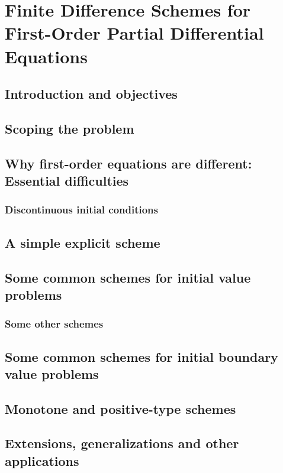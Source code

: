 \chapter{Finite Difference Schemes for First-Order Partial Differential Equations}

\section{Introduction and objectives}

\section{Scoping the problem}

\section{Why first-order equations are different: Essential difficulties}

\subsection{Discontinuous initial conditions}

\section{A simple explicit scheme}

\section{Some common schemes for initial value problems}

\subsection{Some other schemes}

\section{Some common schemes for initial boundary value problems}

\section{Monotone and positive-type schemes}

\section{Extensions, generalizations and other applications}

